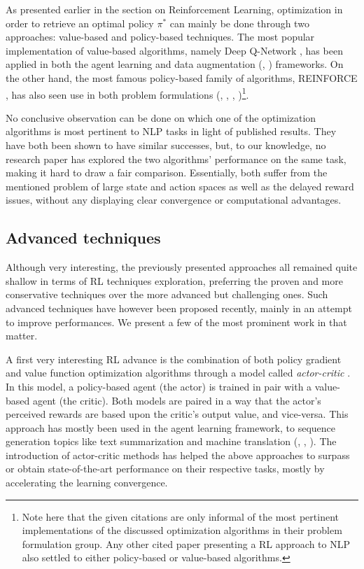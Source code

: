 \documentclass[twocolumn]{article}
\begin{document}
As presented earlier in the section on Reinforcement Learning, optimization in order to retrieve an optimal policy $\pi^*$ can mainly be done through two approaches: value-based and policy-based techniques. The most popular implementation of value-based algorithms, namely Deep Q-Network \citep{mnih2015humanlevel}, has been applied in both the agent learning \citep{DBLP:journals/corr/Guo15b} and data augmentation (\cite{DBLP:journals/corr/NarasimhanYB16}, \cite{DBLP:active_learning}) frameworks. On the other hand, the most famous policy-based family of algorithms, REINFORCE \citep{Williams:1992:SSG:139611.139614}, has also seen use in both problem formulations (\cite{ranzatoCAZ15}, \cite{DBLP:journals/corr/BuckBCGHGW17}, \cite{learning-structured-representation-text-classification-via-reinforcement-learning}, \cite{Zeng2018LargeSR})\footnote{Note here that the given citations are only informal of the most pertinent implementations of the discussed optimization algorithms in their problem formulation group. Any other cited paper presenting a RL approach to NLP also settled to either policy-based or value-based algorithms.}.

No conclusive observation can be done on which one of the optimization algorithms is most pertinent to NLP tasks in light of published results. They have both been shown to have similar successes, but, to our knowledge, no research paper has explored the two algorithms' performance on the same task, making it hard to draw a fair comparison. Essentially, both suffer from the mentioned problem of large state and action spaces as well as the delayed reward issues, without any displaying clear convergence or computational advantages.

\subsection{Advanced techniques}

Although very interesting, the previously presented approaches all remained quite shallow in terms of RL techniques exploration, preferring the proven and more conservative techniques over the more advanced but challenging ones. Such advanced techniques have however been proposed recently, mainly in an attempt to improve performances. We present a few of the most prominent work in that matter.

A first very interesting RL advance is the combination of both policy gradient and value function optimization algorithms through a model called \textit{actor-critic} \citep{sutton2000policy}. In this model, a policy-based agent (the actor) is trained in pair with a value-based agent (the critic). Both models are paired in a way that the actor's perceived rewards are based upon the critic's output value, and vice-versa. This approach has mostly been used in the agent learning framework, to sequence generation topics like text summarization \citep{jurafksy} and machine translation (\cite{BahdanauBXGLPCB16}, \cite{decoding-value-networks}, \cite{jurafksy}). The introduction of actor-critic methods has helped the above approaches to surpass or obtain state-of-the-art performance on their respective tasks, mostly by accelerating the learning convergence.
\end{document}
